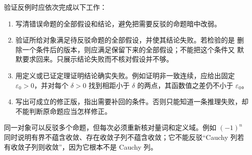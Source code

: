 验证反例时应依次完成以下工作：
\begin{enumerate}
 \item 写清错误命题的全部假设和结论，避免把需要反驳的命题暗中改弱。
 \item 验证所给对象满足待反驳命题的全部假设，并使其结论失败。若检验的是
 删除一个条件后的版本，则应满足保留下来的全部假设；不能把这个条件又
 默默要求回来。只展示结论失败而不核对假设并不够。
 \item 用定义或已证定理证明结论确实失败。例如证明非一致连续，应给出固定 \(\varepsilon_0>0\)，并对每个 \(\delta>0\) 找到相距小于 \(\delta\) 的两点，其函数值之差仍不小于 \(\varepsilon_0\)。
 \item 写出可成立的修正版，指出需要补回的条件。否则只能知道一条推理失败，却不能判断原命题应当怎样修正。
\end{enumerate}

同一对象可以反驳多个命题，但每次必须重新核对量词和定义域。例如 \((-1)^n\) 同时说明有界不蕴含收敛、存在收敛子列不蕴含收敛；它不能反驳“Cauchy 列若有收敛子列则收敛”，因为它根本不是 Cauchy 列。
